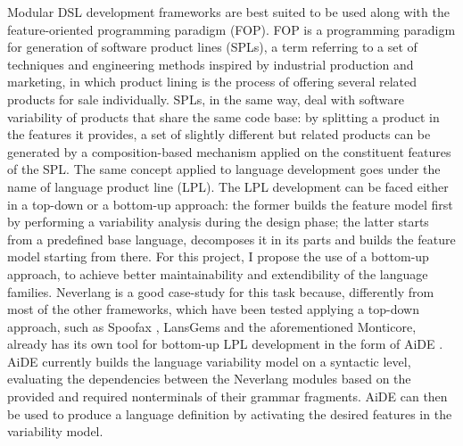 Modular DSL development frameworks are best suited to be used along with the feature-oriented programming paradigm (FOP). FOP is a programming paradigm for generation of software product lines (SPLs), a term referring to a set of techniques and engineering methods inspired by industrial production and marketing, in which product lining is the process of offering several related products for sale individually. SPLs, in the same way, deal with software variability of products that share the same code base: by splitting a product in the features it provides, a set of slightly different but related products can be generated by a composition-based mechanism applied on the constituent features of the SPL. The same concept applied to language development goes under the name of language product line (LPL). The LPL development can be faced either in a top-down or a bottom-up approach: the former builds the feature model first by performing a variability analysis during the design phase; the latter starts from a predefined base language, decomposes it in its parts and builds the feature model starting from there. For this project, I propose the use of a bottom-up approach, to achieve better maintainability and extendibility of the language families. Neverlang is a good case-study for this task because, differently from most of the other frameworks, which have been tested applying a top-down approach, such as Spoofax \cite{Visser10}, LansGems \cite{Wende09} and the aforementioned Monticore, already has its own tool for bottom-up LPL development in the form of AiDE \cite{Cazzola13g, Cazzola14e, Cazzola16i}. AiDE currently builds the language variability model on a syntactic level, evaluating the dependencies between the Neverlang modules based on the provided and required nonterminals of their grammar fragments. AiDE can then be used to produce a language definition by activating the desired features in the variability model.

